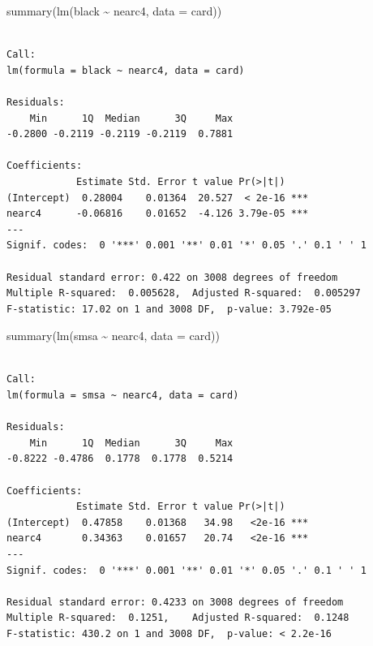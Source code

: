 \documentclass[
  letterpaper,
  DIV=11,
  numbers=noendperiod]{scrartcl}
\newenvironment{Shaded}{\begin{snugshade}}{\end{snugshade}}
\newcommand{\AttributeTok}[1]{\textcolor[rgb]{0.40,0.45,0.13}{#1}}
\newcommand{\FunctionTok}[1]{\textcolor[rgb]{0.28,0.35,0.67}{#1}}
\newcommand{\NormalTok}[1]{\textcolor[rgb]{0.00,0.23,0.31}{#1}}
\newcommand{\SpecialCharTok}[1]{\textcolor[rgb]{0.37,0.37,0.37}{#1}}
\begin{document}
\begin{Shaded}
\begin{Highlighting}[]
\FunctionTok{summary}\NormalTok{(}\FunctionTok{lm}\NormalTok{(black }\SpecialCharTok{\textasciitilde{}}\NormalTok{ nearc4, }\AttributeTok{data =}\NormalTok{ card))}
\end{Highlighting}
\end{Shaded}

\begin{verbatim}

Call:
lm(formula = black ~ nearc4, data = card)

Residuals:
    Min      1Q  Median      3Q     Max 
-0.2800 -0.2119 -0.2119 -0.2119  0.7881 

Coefficients:
            Estimate Std. Error t value Pr(>|t|)    
(Intercept)  0.28004    0.01364  20.527  < 2e-16 ***
nearc4      -0.06816    0.01652  -4.126 3.79e-05 ***
---
Signif. codes:  0 '***' 0.001 '**' 0.01 '*' 0.05 '.' 0.1 ' ' 1

Residual standard error: 0.422 on 3008 degrees of freedom
Multiple R-squared:  0.005628,  Adjusted R-squared:  0.005297 
F-statistic: 17.02 on 1 and 3008 DF,  p-value: 3.792e-05
\end{verbatim}

\begin{Shaded}
\begin{Highlighting}[]
\FunctionTok{summary}\NormalTok{(}\FunctionTok{lm}\NormalTok{(smsa }\SpecialCharTok{\textasciitilde{}}\NormalTok{ nearc4, }\AttributeTok{data =}\NormalTok{ card))}
\end{Highlighting}
\end{Shaded}

\begin{verbatim}

Call:
lm(formula = smsa ~ nearc4, data = card)

Residuals:
    Min      1Q  Median      3Q     Max 
-0.8222 -0.4786  0.1778  0.1778  0.5214 

Coefficients:
            Estimate Std. Error t value Pr(>|t|)    
(Intercept)  0.47858    0.01368   34.98   <2e-16 ***
nearc4       0.34363    0.01657   20.74   <2e-16 ***
---
Signif. codes:  0 '***' 0.001 '**' 0.01 '*' 0.05 '.' 0.1 ' ' 1

Residual standard error: 0.4233 on 3008 degrees of freedom
Multiple R-squared:  0.1251,    Adjusted R-squared:  0.1248 
F-statistic: 430.2 on 1 and 3008 DF,  p-value: < 2.2e-16
\end{verbatim}
\end{document}
